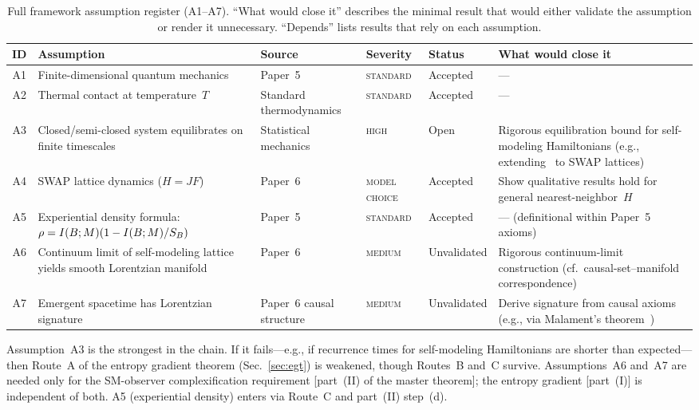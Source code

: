 \begin{table}[t]
  \centering
  \caption{Full framework assumption register (A1--A7).  ``What would
  close it'' describes the minimal result that would either validate
  the assumption or render it unnecessary.  ``Depends'' lists results
  that rely on each assumption.}
  \label{tab:assumptions-full}
  \begin{tabular}{@{}c p{3.5cm} l l l p{4.5cm}@{}}
    \toprule
    ID & Assumption & Source & Severity & Status
       & What would close it \\
    \midrule
    A1 & Finite-dimensional quantum mechanics
       & Paper~5~\cite{Paper5}
       & \textsc{standard}
       & Accepted
       & --- \\[4pt]
    A2 & Thermal contact at temperature~$T$
       & Standard thermodynamics
       & \textsc{standard}
       & Accepted
       & --- \\[4pt]
    A3 & Closed/semi-closed system equilibrates on finite timescales
       & Statistical mechanics
       & \textsc{high}
       & Open
       & Rigorous equilibration bound for self-modeling Hamiltonians
         (e.g., extending~\cite{Short2012} to SWAP lattices) \\[4pt]
    A4 & SWAP lattice dynamics ($H = JF$)
       & Paper~6~\cite{Paper6}
       & \textsc{model choice}
       & Accepted
       & Show qualitative results hold for general nearest-neighbor~$H$ \\[4pt]
    A5 & Experiential density formula:
         $\rho = I(B;M)(1 - I(B;M)/S_B)$
       & Paper~5~\cite{Paper5}
       & \textsc{standard}
       & Accepted
       & --- (definitional within Paper~5 axioms) \\[4pt]
    A6 & Continuum limit of self-modeling lattice yields smooth
         Lorentzian manifold
       & Paper~6~\cite{Paper6}
       & \textsc{medium}
       & Unvalidated
       & Rigorous continuum-limit construction
         (cf.\ causal-set--manifold correspondence) \\[4pt]
    A7 & Emergent spacetime has Lorentzian signature
       & Paper~6 causal structure~\cite{Paper6}
       & \textsc{medium}
       & Unvalidated
       & Derive signature from causal axioms
         (e.g., via Malament's theorem~\cite{Malament1977}) \\
    \bottomrule
  \end{tabular}
\end{table}

\noindent
Assumption~A3 is the strongest in the chain.  If it fails---e.g., if
recurrence times for self-modeling Hamiltonians are shorter than
expected---then Route~A of the entropy gradient theorem
(Sec.~\ref{sec:egt}) is weakened, though Routes~B and~C survive.
Assumptions~A6 and~A7 are needed only for the SM-observer
complexification requirement [part~(II) of the master theorem]; the
entropy gradient [part~(I)] is independent of both.  A5 (experiential
density) enters via Route~C and part~(II) step~(d).

